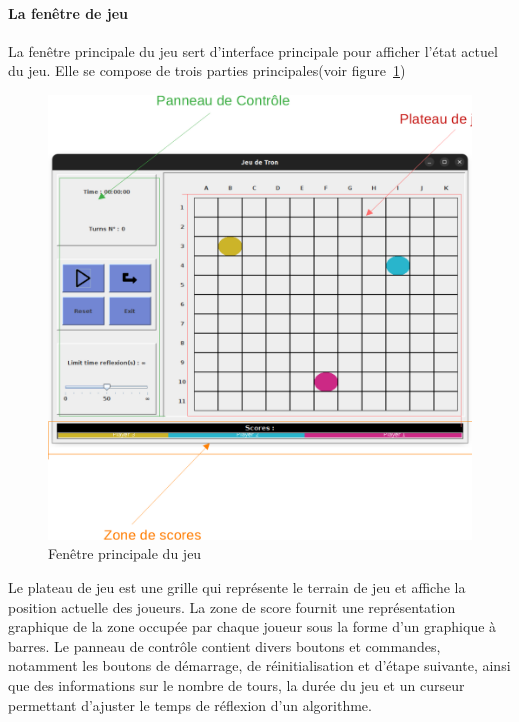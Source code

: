 \tocless\paragraph{La fenêtre de jeu}
La fenêtre principale du jeu sert d'interface principale pour afficher l'état actuel du jeu. Elle se compose de trois parties principales(voir figure~\ref{fig:fenetrejeu})

\begin{figure}[H]
	\centering
	\includegraphics[scale=0.35]{Images/fenetrejeu}
	\caption{Fenêtre principale du jeu}
	\label{fig:fenetrejeu}
\end{figure}

Le plateau de jeu est une grille qui représente le terrain de jeu et affiche la position actuelle des joueurs. La zone de score fournit une représentation graphique de la zone 
occupée par chaque joueur sous la forme d'un graphique à barres. Le panneau de contrôle contient divers boutons et commandes, notamment les boutons de démarrage, de réinitialisation et 
d'étape suivante, ainsi que des informations sur le nombre de tours, la durée du jeu et un curseur permettant d'ajuster le temps de réflexion d'un algorithme.\\

